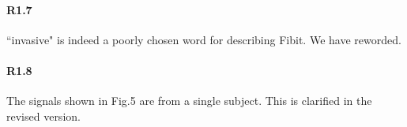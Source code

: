 \paragraph{R1.7} ``invasive" is indeed a poorly chosen word for describing Fibit. We have reworded.

\paragraph{R1.8} The signals shown in Fig.5 are from a single subject. This is clarified in the revised version.
